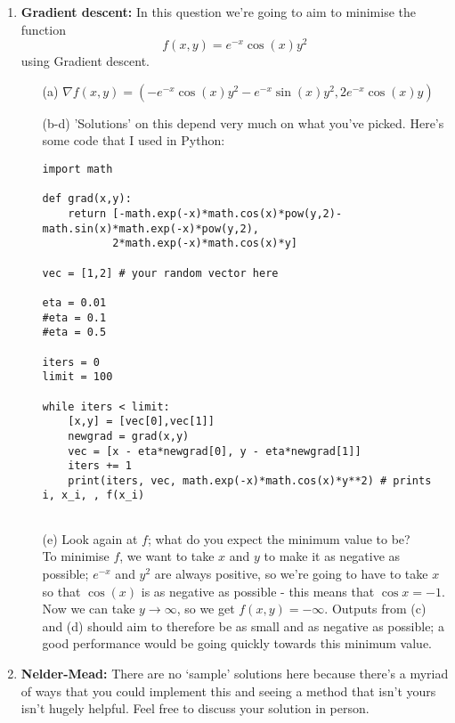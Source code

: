 \documentclass[11pt,a4paper]{scrartcl}
\begin{document}
\begin{enumerate}
\item \textbf{Gradient descent: } In this question we're going to aim to minimise the function 
\[
f(x,y) = e^{-x}\cos(x) y^2
\]
using Gradient descent.

\begin{enumerate}
    \item[(a)] $\nabla f(x,y) = (-e^{-x}\cos(x) y^2 - e^{-x}\sin(x)y^2, 2e^{-x}\cos(x)y)$
    

    \item[(b-d)] 'Solutions' on this depend very much on what you've picked. Here's some code that I used in Python:
    \begin{verbatim}
import math

def grad(x,y):
    return [-math.exp(-x)*math.cos(x)*pow(y,2)-math.sin(x)*math.exp(-x)*pow(y,2),
           2*math.exp(-x)*math.cos(x)*y]

vec = [1,2] # your random vector here

eta = 0.01
#eta = 0.1
#eta = 0.5

iters = 0
limit = 100

while iters < limit:
    [x,y] = [vec[0],vec[1]]
    newgrad = grad(x,y)
    vec = [x - eta*newgrad[0], y - eta*newgrad[1]]
    iters += 1
    print(iters, vec, math.exp(-x)*math.cos(x)*y**2) # prints i, x_i, , f(x_i)
        
    \end{verbatim}
    
    \item[(e)] Look again at $f$; what do you expect the minimum value to be? \\
    To minimise $f$, we want to take $x$ and $y$ to make it as  negative as possible; $e^{-x}$ and $y^2$ are always positive, so we're going to have to take $x$ so that $\cos(x)$ is as negative as possible - this means that $\cos{x}=-1$. Now we can take $y\to \infty$, so we get $f(x,y) = -\infty$. Outputs from (c) and (d) should aim to therefore be as small and as negative as possible; a good performance would be going quickly towards this minimum value. 
\end{enumerate}

\item \textbf{Nelder-Mead: } 
There are no `sample' solutions here because there's a myriad of ways that you could implement this and seeing a method that isn't yours isn't hugely helpful. Feel free to discuss your solution in person. 

\end{enumerate}
\end{document}
